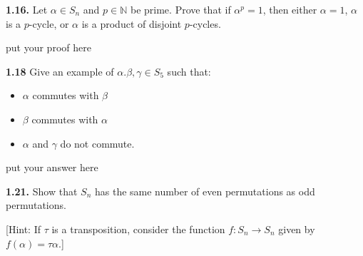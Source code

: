 \documentclass[12pt]{article}
\begin{document}
\textbf{1.16.} Let $\alpha\in S_n$ and $p\in \mathbb{N}$ be prime. Prove that if $\alpha^p=1$, then either $\alpha=1$, $\alpha$ is a $p$-cycle, or $\alpha$ is a product of disjoint $p$-cycles.
	
	\bigskip
	
	put your proof here
	
	\vspace{1in}
	
\textbf{1.18} Give an example of $\alpha. \beta, \gamma\in S_5$ such that:
\begin{itemize}
	\item $\alpha$ commutes with $\beta$
	\item $\beta$ commutes with $\alpha$
	\item $\alpha$ and $\gamma$ do not commute.
\end{itemize}

\bigskip
	
	put your answer here
	
	\vspace{1in}
	
\textbf{1.21.} Show that $S_n$ has the same number of even permutations as odd permutations. 

[Hint: If $\tau$ is a transposition, consider the function $f : S_n\to S_n$ given by $f(\alpha)=\tau\alpha$.]
\end{document}
